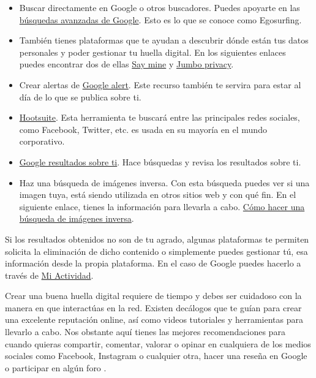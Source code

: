 \documentclass[
  a4paper,
  openany]{book}
\begin{document}
\begin{itemize}
\item
  Buscar directamente en Google o otros buscadores. Puedes apoyarte en las \href{https://support.google.com/websearch/answer/2466433?hl=es}{búsquedas avanzadas de Google}. Esto es lo que se conoce como Egosurfing.
\item
  También tienes plataformas que te ayudan a descubrir dónde están tus datos personales y poder gestionar tu huella digital. En los siguientes enlaces puedes encontrar dos de ellas \href{https://saymine.com/}{Say mine} y \href{https://www.jumboprivacy.com/}{Jumbo privacy}.
\item
  Crear alertas de \href{https://www.google.es/alerts}{Google alert}. Este recurso también te servira para estar al día de lo que se publica sobre ti.
\item
  \href{https://www.hootsuite.com/}{Hootsuite}. Esta herramienta te buscará entre las principales redes sociales, como Facebook, Twitter, etc. es usada en su mayoría en el mundo corporativo.
\item
  \href{https://myactivity.google.com/results-about-you}{Google resultados sobre ti}. Hace búsquedas y revisa los resultados sobre ti.
\item
  Haz una búsqueda de imágenes inversa. Con esta búsqueda puedes ver si una imagen tuya, está siendo utilizada en otros sitios web y con qué fin. En el siguiente enlace, tienes la información para llevarla a cabo. \href{https://www.incibe.es/ciudadania/formacion/recursosdescargables/como-hacer-busqueda-imagenes-inversa}{Cómo hacer una búsqueda de imágenes inversa}.
\end{itemize}

Si los resultados obtenidos no son de tu agrado, algunas plataformas te permiten solicita la eliminación de dicho contenido o simplemente puedes gestionar tú, esa información desde la propia plataforma. En el caso de Google puedes hacerlo a través de \href{https://myactivity.google.com/myactivity}{Mi Actividad}.

Crear una buena huella digital requiere de tiempo y debes ser cuidadoso con la manera en que interactúas en la red. Existen decálogos que te guían para crear una excelente reputación online, así como videos tutoriales y herramientas para llevarlo a cabo. Nos obstante aquí tienes las mejores recomendaciones para cuando quieras compartir, comentar, valorar o opinar en cualquiera de los medios sociales como Facebook, Instagram o cualquier otra, hacer una reseña en Google o participar en algún foro \citep{decalogo-digital}.
\end{document}
